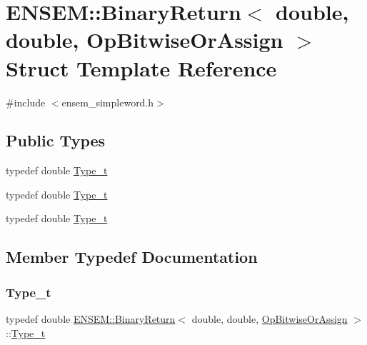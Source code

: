 \hypertarget{structENSEM_1_1BinaryReturn_3_01double_00_01double_00_01OpBitwiseOrAssign_01_4}{}\section{E\+N\+S\+EM\+:\+:Binary\+Return$<$ double, double, Op\+Bitwise\+Or\+Assign $>$ Struct Template Reference}
\label{structENSEM_1_1BinaryReturn_3_01double_00_01double_00_01OpBitwiseOrAssign_01_4}


{\ttfamily \#include $<$ensem\+\_\+simpleword.\+h$>$}

\subsection*{Public Types}
\begin{DoxyCompactItemize}
\item 
typedef double \mbox{\hyperlink{structENSEM_1_1BinaryReturn_3_01double_00_01double_00_01OpBitwiseOrAssign_01_4_a28cf6b687041196193aa5c2f774eb33b}{Type\+\_\+t}}
\item 
typedef double \mbox{\hyperlink{structENSEM_1_1BinaryReturn_3_01double_00_01double_00_01OpBitwiseOrAssign_01_4_a28cf6b687041196193aa5c2f774eb33b}{Type\+\_\+t}}
\item 
typedef double \mbox{\hyperlink{structENSEM_1_1BinaryReturn_3_01double_00_01double_00_01OpBitwiseOrAssign_01_4_a28cf6b687041196193aa5c2f774eb33b}{Type\+\_\+t}}
\end{DoxyCompactItemize}


\subsection{Member Typedef Documentation}
\mbox{\label{structENSEM_1_1BinaryReturn_3_01double_00_01double_00_01OpBitwiseOrAssign_01_4_a28cf6b687041196193aa5c2f774eb33b}} 
\subsubsection{\texorpdfstring{Type\_t}{Type\_t}\hspace{0.1cm}{\footnotesize\ttfamily [1/3]}}
{\footnotesize\ttfamily typedef double \mbox{\hyperlink{structENSEM_1_1BinaryReturn}{E\+N\+S\+E\+M\+::\+Binary\+Return}}$<$ double, double, \mbox{\hyperlink{structENSEM_1_1OpBitwiseOrAssign}{Op\+Bitwise\+Or\+Assign}} $>$\+::\mbox{\hyperlink{structENSEM_1_1BinaryReturn_3_01double_00_01double_00_01OpBitwiseOrAssign_01_4_a28cf6b687041196193aa5c2f774eb33b}{Type\+\_\+t}}}

